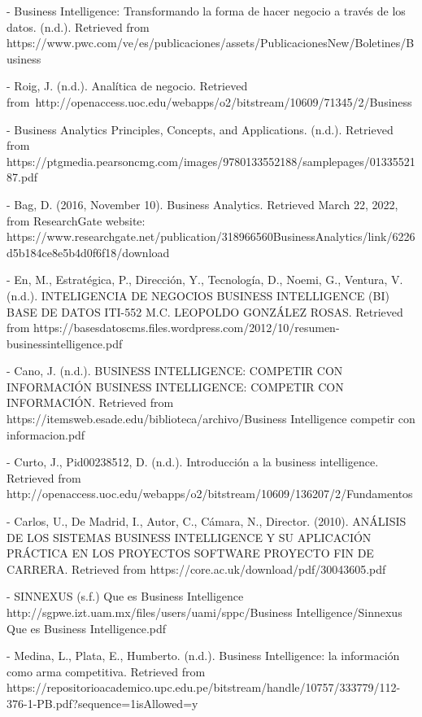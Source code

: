\documentclass[twoside,twocolumn]{article}
\begin{document}

\begin{thebibliography}{XXX0000}
	\bibitem  - Business Intelligence: Transformando la forma de hacer negocio a través de los datos. (n.d.). Retrieved from https://www.pwc.com/ve/es/publicaciones/assets/PublicacionesNew/Boletines/Business
	
  \bibitem  - Roig, J. (n.d.). Analítica de negocio. Retrieved from\ http://openaccess.uoc.edu/webapps/o2/bitstream/10609/71345/2/Business
	
  \bibitem  - Business Analytics Principles, Concepts, 
  and Applications. (n.d.). Retrieved from 
  https://ptgmedia.pearsoncmg.com/images/9780133552188/samplepages/0133552187.pdf
	
  \bibitem  - Bag, D. (2016, November 10). Business Analytics. 
  Retrieved March 22, 2022, from ResearchGate website: 
  https://www.researchgate.net/publication/318966560BusinessAnalytics/link/6226d5b184ce8e5b4d0f6f18/download
	
  \bibitem  - En, M., Estratégica, P., Dirección, Y., 
  Tecnología, D., Noemi, G.,  Ventura, V. (n.d.). 
  INTELIGENCIA DE NEGOCIOS BUSINESS INTELLIGENCE (BI) BASE DE 
  DATOS ITI-552 M.C. LEOPOLDO GONZÁLEZ ROSAS. Retrieved from 
  https://basesdatoscms.files.wordpress.com/2012/10/resumen-businessintelligence.pdf
	
  \bibitem  - Cano, J. (n.d.). BUSINESS INTELLIGENCE:
   COMPETIR CON INFORMACIÓN BUSINESS INTELLIGENCE: 
   COMPETIR CON INFORMACIÓN. Retrieved from https://itemsweb.esade.edu/biblioteca/archivo/Business Intelligence competir con informacion.pdf
	
  \bibitem  - Curto, J.,  Pid00238512, D. (n.d.). 
  Introducción a la business intelligence. Retrieved from 
  http://openaccess.uoc.edu/webapps/o2/bitstream/10609/136207/2/Fundamentos
	
  \bibitem  - Carlos, U., De Madrid, I., Autor, C., 
  Cámara, N.,  Director. (2010). ANÁLISIS DE LOS SISTEMAS 
  BUSINESS INTELLIGENCE Y SU APLICACIÓN PRÁCTICA EN LOS PROYECTOS SOFTWARE PROYECTO FIN DE CARRERA. Retrieved from https://core.ac.uk/download/pdf/30043605.pdf
	
  \bibitem  - SINNEXUS (s.f.) Que es Business 
  Intelligence 
  http://sgpwe.izt.uam.mx/files/users/uami/sppc/Business Intelligence/Sinnexus Que es Business Intelligence.pdf
	
  \bibitem  - Medina, L., Plata, E.,  Humberto. (n.d.). 
  Business Intelligence: la información como arma competitiva. 
  Retrieved from https://repositorioacademico.upc.edu.pe/bitstream/handle/10757/333779/112-376-1-PB.pdf?sequence=1isAllowed=y

\end{thebibliography}

\end{document}
